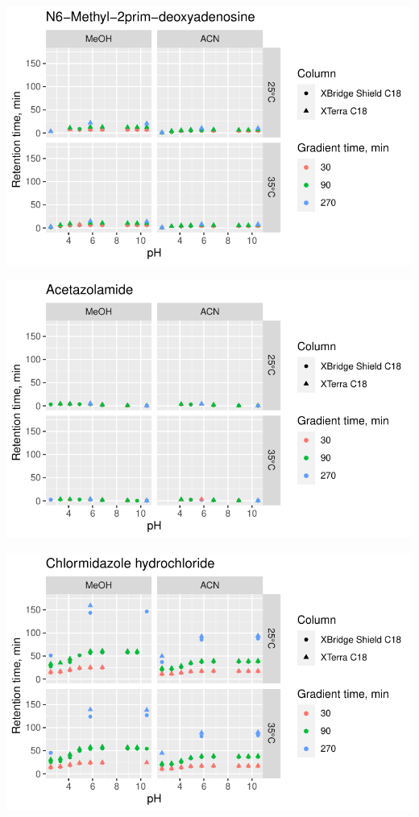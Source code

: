 \documentclass[
  letterpaper,
  DIV=11,
  numbers=noendperiod]{scrreprt}
\begin{document}
\includegraphics{index_files/figure-pdf/unnamed-chunk-4-159.pdf}

\includegraphics{index_files/figure-pdf/unnamed-chunk-4-160.pdf}

\includegraphics{index_files/figure-pdf/unnamed-chunk-4-161.pdf}
\end{document}
